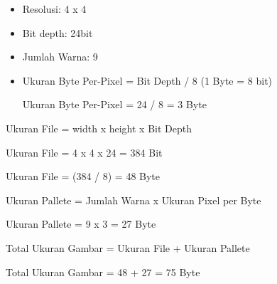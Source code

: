 \documentclass[10pt, a4paper]{article}
\begin{document}
\begin{enumerate}
    \begin{center}

      \begin{itemize}
        \item Resolusi: 4 x 4
        \item Bit depth: 24bit
        \item Jumlah Warna: 9

        \item Ukuran Byte Per-Pixel = Bit Depth / 8 (1 Byte = 8 bit)

              Ukuran Byte Per-Pixel = 24 / 8 = 3 Byte
      \end{itemize}

        \vspace{0.2cm}

        Ukuran File = width x height x Bit Depth

        Ukuran File = 4 x 4 x 24 = 384 Bit 

        Ukuran File = (384 / 8) = 48 Byte

        \vspace{0.2cm}

        Ukuran Pallete = Jumlah Warna x Ukuran Pixel per Byte

        Ukuran Pallete = 9 x 3 = 27 Byte

        \vspace{0.2cm}

        Total Ukuran Gambar = Ukuran File + Ukuran Pallete

        Total Ukuran Gambar = 48 + 27 = 75 Byte


    \end{center}


\end{enumerate}
\end{document}
